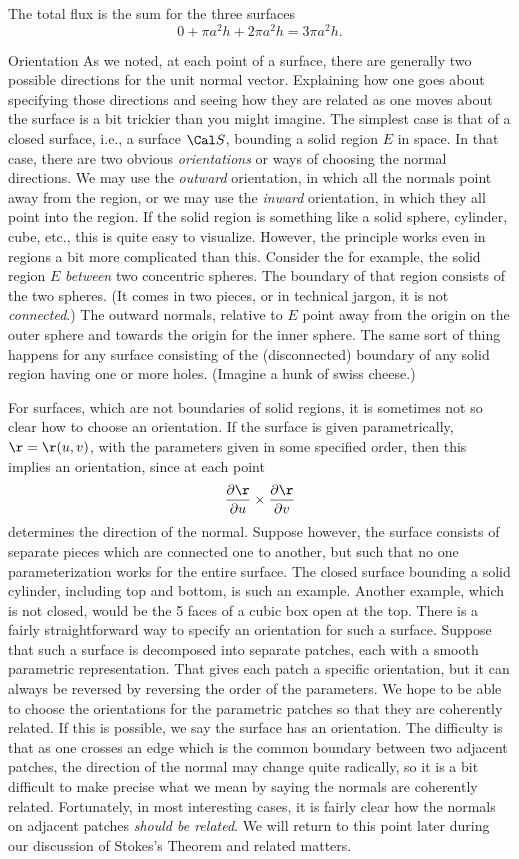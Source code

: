 The total flux is the sum for the three surfaces
$$
    0 + \pi a^2 h + 2\pi a^2 h = 3\pi a^2 h.
$$
\endexample

\subhead Orientation \endsubhead
As we noted, at each point of a surface, there are generally
two possible directions for the unit normal vector.  Explaining
how one goes about specifying those directions and seeing how
they are related as one moves about the surface is a bit
trickier than you might imagine.  The simplest case is that
of a closed surface, i.e., a surface $\Cal S$,
 bounding a solid region $E$
in space.  In that case, there are two obvious {\it orientations\/}
or ways of choosing the normal directions.  We may use the
{\it outward\/} orientation, in which all the normals point
away from the region, or we may use the {\it inward\/}
orientation, in which they all point into the region.   If the
solid region is something like a solid sphere, cylinder, cube,
etc., this is quite easy to visualize.  However, the principle
works even in regions a bit more complicated than this.
Consider the for example, the solid region $E$ {\it between\/}
two concentric spheres.  The boundary of
that region consists of the two spheres.  (It comes in two
pieces, or in technical jargon, it is not {\it connected}.) 
The outward normals, relative to  
$E$ point away from the origin on the outer sphere and towards
the origin for the inner sphere.  The same sort of thing happens
for any surface consisting of the (disconnected) boundary of
any solid region having one or more holes.  (Imagine a hunk of
swiss cheese.) 
\medskip
\centerline{}
\medskip
For surfaces, which are not boundaries of solid regions, it is
sometimes not so clear how to choose an orientation.  If the
surface is given parametrically, $\r = \r(u,v)$, with the
parameters given in some specified order, then this implies
an orientation, since at each point 
$$
\frac{\partial\r}{\partial u}\times\frac{\partial\r}{\partial v}
$$
determines the direction of the normal.  Suppose however, the
surface consists of separate pieces which are connected one to
another, but such that no one parameterization works for
the entire surface.  The closed surface bounding a solid
cylinder, including top and bottom, is such an example.
Another example, which is not closed, would be the 5 faces of
a cubic box open at the top. There is a fairly straightforward
way to specify an orientation for such a surface.  Suppose that
such a surface is decomposed into separate patches, each 
with a smooth
parametric representation. That gives each
patch a 
specific orientation, but it can always be reversed by
reversing the order of the parameters. 
We hope to be able to choose the orientations for the
parametric patches so that they are coherently related.
If this is possible, we say the surface has an orientation. 
The difficulty is that as one crosses an  edge which is
the common boundary between two adjacent patches, the direction
of the normal may change quite radically, so it is a bit
difficult to make precise what we mean by saying the normals are
coherently related.  Fortunately, in most interesting cases,
it is fairly clear how the normals on adjacent patches
{\it should be related}.   We will return to this point later
during our discussion of Stokes's Theorem and related
matters.  

